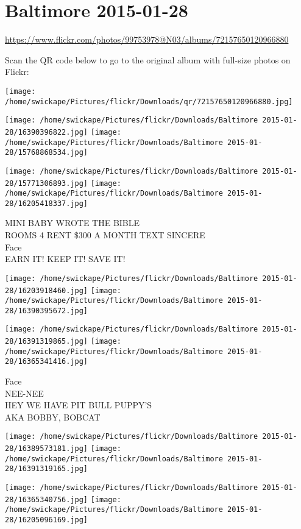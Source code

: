 \documentclass[10pt,letterpaper]{article}
\title{}
\author{}
\date{}
\begin{document}
\section*{Baltimore 2015-01-28}

\url{https://www.flickr.com/photos/99753978@N03/albums/72157650120966880}

Scan the QR code below to go to the original album with full-size photos on Flickr:

\texttt{[image: /home/swickape/Pictures/flickr/Downloads/qr/72157650120966880.jpg]}
\pagebreak

\texttt{[image: /home/swickape/Pictures/flickr/Downloads/Baltimore 2015-01-28/16390396822.jpg]}
\texttt{[image: /home/swickape/Pictures/flickr/Downloads/Baltimore 2015-01-28/15768868534.jpg]}

\texttt{[image: /home/swickape/Pictures/flickr/Downloads/Baltimore 2015-01-28/15771306893.jpg]}
\texttt{[image: /home/swickape/Pictures/flickr/Downloads/Baltimore 2015-01-28/16205418337.jpg]}

MINI BABY WROTE THE BIBLE\\
ROOMS 4 RENT \$300 A MONTH TEXT SINCERE\\
Face\\
EARN IT!  KEEP IT!  SAVE IT!
\pagebreak

\texttt{[image: /home/swickape/Pictures/flickr/Downloads/Baltimore 2015-01-28/16203918460.jpg]}
\texttt{[image: /home/swickape/Pictures/flickr/Downloads/Baltimore 2015-01-28/16390395672.jpg]}

\texttt{[image: /home/swickape/Pictures/flickr/Downloads/Baltimore 2015-01-28/16391319865.jpg]}
\texttt{[image: /home/swickape/Pictures/flickr/Downloads/Baltimore 2015-01-28/16365341416.jpg]}

Face\\
NEE{-}NEE\\
HEY WE HAVE PIT BULL PUPPY'S\\
AKA BOBBY, BOBCAT
\pagebreak

\texttt{[image: /home/swickape/Pictures/flickr/Downloads/Baltimore 2015-01-28/16389573181.jpg]}
\texttt{[image: /home/swickape/Pictures/flickr/Downloads/Baltimore 2015-01-28/16391319165.jpg]}

\texttt{[image: /home/swickape/Pictures/flickr/Downloads/Baltimore 2015-01-28/16365340756.jpg]}
\texttt{[image: /home/swickape/Pictures/flickr/Downloads/Baltimore 2015-01-28/16205096169.jpg]}
\end{document}

